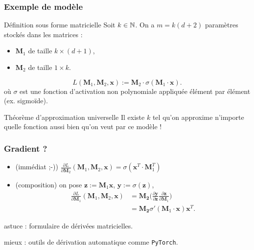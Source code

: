 \documentclass{beamer}
\newcommand{\N}{{\ensuremath\mathbb{N}}}
\begin{document}
\newcommand\mat[1]{\mathbf{#1}}

\begin{frame}
  \frametitle{Exemple de modèle}
  
  \begin{block}{Définition sous forme matricielle}
    Soit $k \in \N$.
    On a $m = k(d+2)$ paramètres stockés dans les matrices :
    \begin{itemize}
      \item $\mat{M}_1$ de taille $k \times (d+1)$,
      \item $\mat{M}_2$ de taille $1 \times k$.
    \end{itemize}
    
    \[ L(\mat{M}_1, \mat{M}_2, \mat{x}) := \mat{M}_2 \cdot \sigma ( \mat{M}_1 \cdot \mat{x} ). \]
    où $\sigma$ est une fonction d'activation non polynomiale appliquée
    élément par élément (ex. sigmoïde). 
  \end{block}
  
  \begin{block}{Théorème d'approximation universelle}
  Il existe $k$ tel qu'on approxime n'importe quelle fonction
  aussi bien qu'on veut par ce modèle ! 
  \end{block}

\end{frame}

\begin{frame}
  \frametitle{Gradient ?}

  \begin{itemize}
  \item (immédiat ;-)) $\frac{\partial L}{\partial \mat{M}_2}(\mat{M}_1, \mat{M}_2, \mat{x})
    = \sigma ( \mat{x}^T \cdot \mat{M}_1^T )$
  \item (composition) on pose $\mat{z}:=\mat{M}_1\mat{x}$, $\mat{y}:=\sigma(\mat{z})$,
    \begin{align*}
    \frac{\partial L}{\partial \mat{M}_1}(\mat{M}_1, \mat{M}_2, \mat{x})
    &= \mat{M_2} \Bigg( \frac{\partial \mat{y}}{\partial \mat{z}} \frac{\partial \mat{z}}{\partial \mat{M}_1} \Bigg) \\
    &= \mat{M_2} \sigma'( \mat{M}_1 \cdot \mat{x} ) \mat{x}^T.
    \end{align*}
  \end{itemize}

  astuce : formulaire de dérivées matricielles.

  mieux : outils de dérivation automatique comme \verb!PyTorch!.
  
\end{frame}
\end{document}
